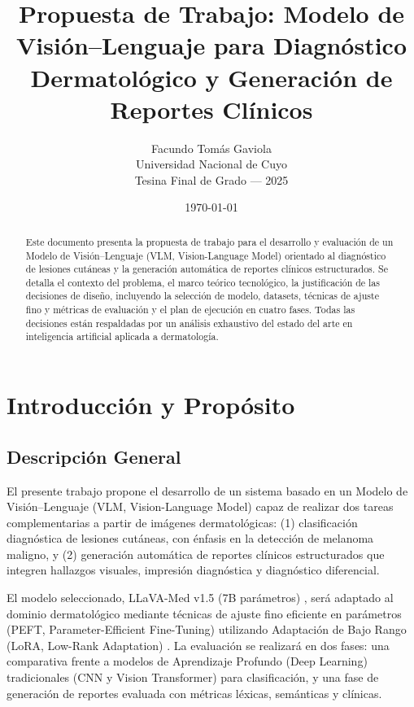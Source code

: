 \documentclass[11pt, a4paper]{article}
\title{\textbf{Propuesta de Trabajo: Modelo de Visión--Lenguaje para Diagnóstico Dermatológico y Generación de Reportes Clínicos}}
\author{Facundo Tomás Gaviola \\ \small Universidad Nacional de Cuyo \\ \small Tesina Final de Grado — 2025}
\date{\today}
\begin{document}
\maketitle

\begin{abstract}
Este documento presenta la propuesta de trabajo para el desarrollo y evaluación de un Modelo de Visión--Lenguaje (VLM, Vision-Language Model) orientado al diagnóstico de lesiones cutáneas y la generación automática de reportes clínicos estructurados.
Se detalla el contexto del problema, el marco teórico tecnológico, la justificación de las decisiones de diseño, incluyendo la selección de modelo, datasets, técnicas de ajuste fino y métricas de evaluación y el plan de ejecución en cuatro fases. Todas
las decisiones están respaldadas por un análisis exhaustivo del estado del arte en inteligencia artificial aplicada a dermatología.
\end{abstract}

\tableofcontents
\newpage

\section{Introducción y Propósito}

\subsection{Descripción General}

El presente trabajo propone el desarrollo de un sistema basado en un Modelo de Visión--Lenguaje (VLM, Vision-Language Model) capaz de realizar dos tareas complementarias a partir de imágenes dermatológicas: (1) clasificación diagnóstica de lesiones cutáneas,
con énfasis en la detección de melanoma maligno, y (2) generación automática de reportes clínicos estructurados que integren hallazgos visuales, impresión diagnóstica y diagnóstico diferencial.

El modelo seleccionado, LLaVA-Med v1.5 (7B parámetros) \cite{li_llava-med_2023}, será adaptado al dominio dermatológico mediante técnicas de ajuste fino eficiente en parámetros (PEFT, Parameter-Efficient Fine-Tuning) utilizando Adaptación de Bajo Rango 
(LoRA, Low-Rank Adaptation) \cite{hu_lora_2021}. La evaluación se realizará en dos fases: una comparativa frente a modelos de Aprendizaje Profundo (Deep Learning) tradicionales (CNN y Vision Transformer) para clasificación, y una fase de generación de reportes
evaluada con métricas léxicas, semánticas y clínicas.
\end{document}

